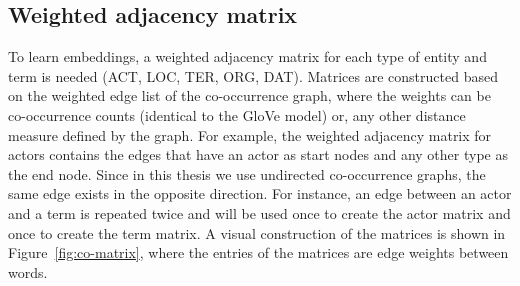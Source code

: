 \subsection{Weighted adjacency matrix}\label{sec:adj_matrix}
To learn embeddings, a weighted adjacency matrix for each type of entity and term is needed (ACT, LOC, TER, ORG, DAT). Matrices are constructed based on the weighted edge list of the co-occurrence graph, where the weights can be co-occurrence counts (identical to the GloVe model) or, any other distance measure defined by the graph. For example, the weighted adjacency matrix for actors contains the edges that have an actor as start nodes and any other type as the end node. Since in this thesis we use undirected co-occurrence graphs, the same edge exists in the opposite direction. For instance, an edge between an actor and a term is repeated twice and will be used once to create the actor matrix and once to create the term matrix. A visual construction of the matrices is shown in Figure~\ref{fig:co-matrix}, where the entries of the matrices are edge weights between words.  
